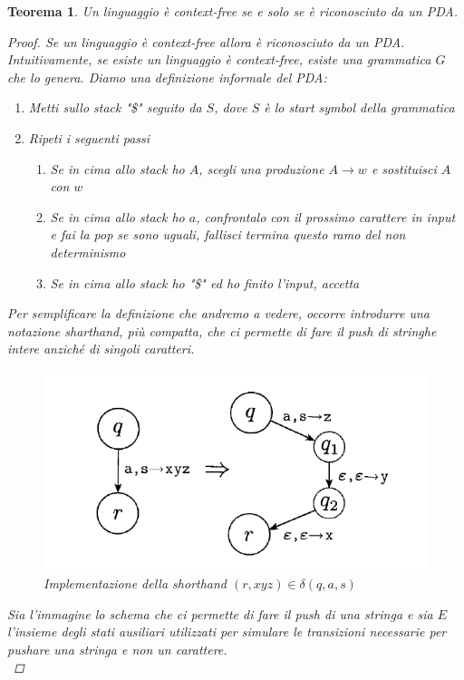 \documentclass[italian]{article}
\newtheorem*{theorem*}{Teorema}
\begin{document}
\begin{theorem*}
	Un linguaggio è \textit{context-free} se e solo se è riconosciuto da un PDA.
	\begin{proof}
		Se un linguaggio è \textit{context-free} allora è riconosciuto da un PDA. Intuitivamente, se esiste un linguaggio è \textit{context-free}, esiste una grammatica $G$ che lo genera. Diamo una definizione informale del PDA:
		\begin{enumerate}
			\item Metti sullo stack "\$" seguito da $S$, dove $S$ è lo \textit{start symbol} della grammatica
			\item Ripeti i seguenti passi
				\begin{enumerate}
					\item Se in cima allo stack ho $A$, scegli una produzione $A \to w$ e sostituisci $A$ con $w$
					\item Se in cima allo stack ho $a$, confrontalo con il prossimo carattere in input e fai la pop se sono uguali, fallisci termina questo ramo del non determinismo
					\item Se in cima allo stack ho "\$" ed ho finito l'input, accetta
				\end{enumerate}
		\end{enumerate}
		Per semplificare la definizione che andremo a vedere, occorre introdurre una notazione sharthand, più compatta, che ci permette di fare il push di stringhe intere anziché di singoli caratteri.
		\begin{center}
			\begin{figure}[h]
				\centering
				\includegraphics[width=0.5\linewidth]{images/pda-shorthand}
				\caption[Implementazione della shorthand $(r,xyz) \in \delta(q,a,s)$]{Implementazione della shorthand $(r,xyz) \in \delta(q,a,s)$}
				\label{fig:pda-shorthand}
			\end{figure}
	\end{center}
	Sia l'immagine lo schema che ci permette di fare il push di una stringa e sia $E$ l'insieme degli stati ausiliari utilizzati per simulare le transizioni necessarie per pushare una stringa e non un carattere. \\
	

\end{proof}
\end{theorem*}
\end{document}

